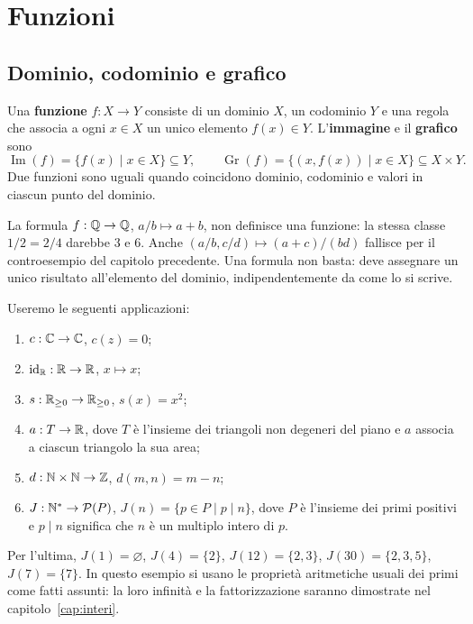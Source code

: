 \chapter{Funzioni}

\section{Dominio, codominio e grafico}
\begin{definizione}
Una \textbf{funzione} $f:X\to Y$ consiste di un dominio $X$, un codominio $Y$ e una regola che associa a ogni $x\in X$ un unico elemento $f(x)\in Y$. L'\textbf{immagine} e il \textbf{grafico} sono
\[
\operatorname{Im}(f)=\{f(x)\mid x\in X\}\subseteq Y,\qquad
\operatorname{Gr}(f)=\{(x,f(x))\mid x\in X\}\subseteq X\times Y.
\]
Due funzioni sono uguali quando coincidono dominio, codominio e valori in ciascun punto del dominio.
\end{definizione}

\begin{esempio}
La formula $f:\mathbb{Q}\to\mathbb{Q}$, $a/b\mapsto a+b$, non definisce una funzione: la stessa classe $1/2=2/4$ darebbe $3$ e $6$. Anche $(a/b,c/d)\mapsto(a+c)/(bd)$ fallisce per il controesempio del capitolo precedente. Una formula non basta: deve assegnare un unico risultato all'elemento del dominio, indipendentemente da come lo si scrive.
\end{esempio}

\begin{esempio}
Useremo le seguenti applicazioni:
\begin{enumerate}[label=\alph*)]
\item $c:\mathbb{C}\to\mathbb{C}$, $c(z)=0$;
\item $\operatorname{id}_{\mathbb{R}}:\mathbb{R}\to\mathbb{R}$, $x\mapsto x$;
\item $s:\mathbb{R}_{\ge0}\to\mathbb{R}_{\ge0}$, $s(x)=x^2$;
\item $a:T\to\mathbb{R}$, dove $T$ è l'insieme dei triangoli non degeneri del piano e $a$ associa a ciascun triangolo la sua area;
\item $d:\mathbb{N}\times\mathbb{N}\to\mathbb{Z}$, $d(m,n)=m-n$;
\item $J:\mathbb{N}^*\to\mathcal P(P)$, $J(n)=\{p\in P\mid p\mid n\}$, dove $P$ è l'insieme dei primi positivi e $p\mid n$ significa che $n$ è un multiplo intero di $p$.
\end{enumerate}
Per l'ultima, $J(1)=\varnothing$, $J(4)=\{2\}$, $J(12)=\{2,3\}$, $J(30)=\{2,3,5\}$, $J(7)=\{7\}$. In questo esempio si usano le proprietà aritmetiche usuali dei primi come fatti assunti: la loro infinità e la fattorizzazione saranno dimostrate nel capitolo~\ref{cap:interi}.
\end{esempio}

